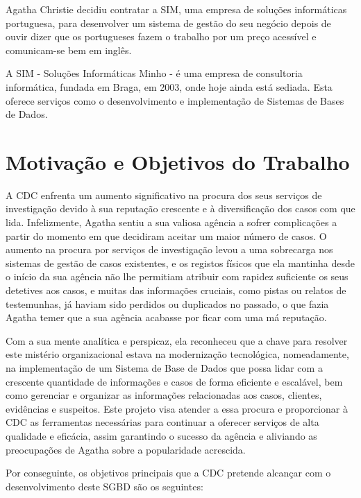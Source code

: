 \documentclass[a4paper,12pt]{scrreprt}
\begin{document}
    Agatha Christie decidiu contratar a SIM, uma empresa de soluções informáticas portuguesa,
    para desenvolver um sistema de gestão do seu negócio depois de ouvir dizer que os portugueses fazem o trabalho por um preço acessível e comunicam-se bem em inglês.

    A SIM - Soluções Informáticas Minho - é uma empresa de consultoria informática, fundada em
    Braga, em 2003, onde hoje ainda está sediada. Esta oferece serviços como o desenvolvimento e
    implementação de Sistemas de Bases de Dados.

    \pagebreak

    \section{Motivação e Objetivos do Trabalho}
    A CDC enfrenta um aumento significativo na procura dos seus serviços de investigação devido à
    sua reputação crescente e à diversificação dos casos com que lida. Infelizmente, Agatha sentiu a sua
    valiosa agência a sofrer complicações a partir do momento em que decidiram aceitar um maior número
    de casos. O aumento na procura por serviços de investigação levou a uma sobrecarga nos sistemas de
    gestão de casos existentes, e os registos físicos que ela mantinha desde o início da sua
    agência não lhe permitiam atribuir com rapidez suficiente os seus detetives aos casos, e muitas das
    informações cruciais, como pistas ou relatos de testemunhas, já haviam sido perdidos ou duplicados
    no passado, o que fazia Agatha temer que a sua agência acabasse por ficar com uma má reputação.
    
    Com a sua mente analítica e perspicaz, ela reconheceu que a chave para resolver este mistério
    organizacional estava  na modernização tecnológica, nomeadamente, na implementação de um Sistema de
    Base de Dados que possa lidar com a crescente quantidade de informações e casos de forma eficiente e
    escalável, bem como gerenciar e organizar as informações relacionadas aos casos, clientes, evidências
    e suspeitos. Este projeto visa atender a essa procura e proporcionar à CDC as ferramentas necessárias
    para continuar a oferecer serviços de alta qualidade e eficácia, assim garantindo o sucesso da agência
    e aliviando as preocupações de Agatha sobre a popularidade acrescida.

    \clearpage
    
    Por conseguinte, os objetivos principais que a CDC pretende alcançar com o desenvolvimento deste SGBD são os seguintes:
    
\end{document}

